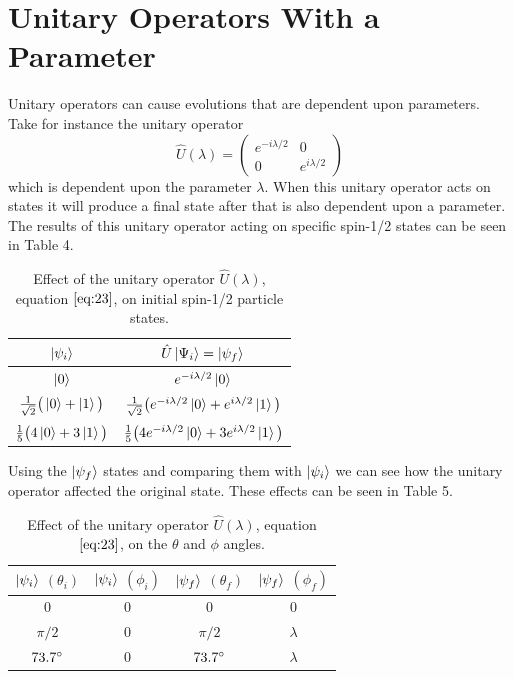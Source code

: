 \documentclass[twocolumn]{article}
\begin{document}
\section*{Unitary Operators With a Parameter}
Unitary operators can cause evolutions that are dependent upon parameters. Take for instance the unitary operator
\begin{equation}\label{eq:23}
\hat{U}(\lambda)=
\begin{pmatrix}
e^{-i\lambda/2} & 0 \\
0 & e^{i\lambda/2}
\end{pmatrix}
\end{equation}
which is dependent upon the parameter $\lambda$. When this unitary operator acts on states it will produce a final state after that is also dependent upon a parameter. The results of this unitary operator acting on specific spin-1/2 states can be seen in Table 4. \\
\newpage
\begin{table}[h!]
\begin{center}
\begin{tabular}{ |c|c| }
\hline $\ket{\psi_i}$& $\hat{U}\ket{\Psi_i}=\ket{\psi_f}$ \\
\hline $\ket{0}$& $e^{-i\lambda/2}\ket{0}$\\
\hline $\frac{1}{\sqrt{2}}\big(\ket{0}+\ket{1}\big)$& $\frac{1}{\sqrt{2}}\big(e^{-i\lambda/2}\ket{0}+e^{i\lambda/2}\ket{1}\big)$\\
\hline $\frac{1}{5}\big(4\ket{0}+3\ket{1}\big)$& $\frac{1}{5}\big(4e^{-i\lambda/2}\ket{0}+3e^{i\lambda/2}\ket{1}\big)$\\
\hline
\end{tabular}
\caption{Effect of the unitary operator $\hat{U}(\lambda)$, equation $\ref{eq:23}$, on initial spin-1/2 particle states.}
\end{center}
\end{table} 
Using the $\ket{\psi_f}$ states and comparing them with $\ket{\psi_i}$ we can see how the unitary operator affected the original state. These effects can be seen in Table 5.
\begin{table}[h!]
\begin{center}
\begin{tabular}{ |c|c|c|c| }
\hline $\ket{\psi_i}$ $(\theta_i)$& $\ket{\psi_i}$ $(\phi_i)$& $\ket{\psi_f}$ $(\theta_f)$& $\ket{\psi_f}$ $(\phi_f)$ \\
\hline 0 & 0 & 0 & 0 \\
\hline $\pi/2$ & 0 & $\pi/2$ & $\lambda$ \\
\hline $73.7\degree$ & $0$ & $73.7\degree$ & $\lambda$ \\
\hline
\end{tabular}
\caption{Effect of the unitary operator $\hat{U}(\lambda)$, equation $\ref{eq:23}$, on the $\theta$ and $\phi$ angles.}
\end{center}
\end{table} \\
\end{document}
